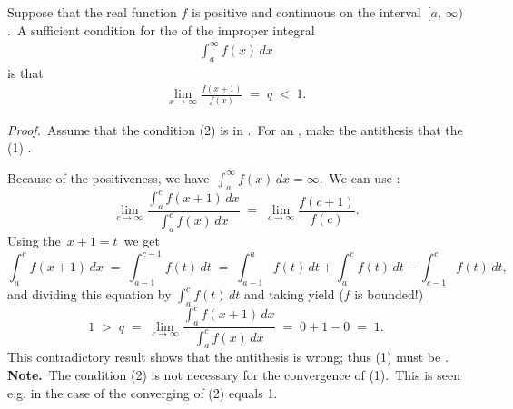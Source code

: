 \documentclass[12pt]{article}
\theoremstyle{definition}
\begin{document}
Suppose that the real function $f$ is positive and continuous on the interval \,$[a,\,\infty)$.\, A sufficient condition for the  of the improper integral
\begin{align}
\int_a^\infty\!f(x)\,dx
\end{align}
is that
\begin{align}
\lim_{x\to\infty}\frac{f(x\!+\!1)}{f(x)} \;=\; q \;<\; 1.
\end{align}

\emph{Proof.}\, Assume that the condition (2) is in .\, For an , make the antithesis that the  (1) .

Because of the positiveness, we have\, $\int_a^\infty\!f(x)\,dx = \infty$.\, We can use :
$$\lim_{c\to\infty}\frac{\int_a^c\!f(x\!+\!1)\,dx}{\int_a^c\!f(x)\,dx} \;=\; \lim_{c\to\infty}\frac{f(c\!+\!1)}{f(c)}.$$
Using the  \,$x\!+\!1 = t$\, we get
$$\int_a^c\!f(x\!+\!1)\,dx \;=\; \int_{a-1}^{c-1}f(t)\,dt 
\;=\; \int_{a-1}^a\!f(t)\,dt+\int_a^c\!f(t)\,dt-\int_{c-1}^c\!f(t)\,dt,$$
and dividing this equation by $\int_a^cf(t)\,dt$ and taking  yield ($f$ is bounded!)
$$1 \;>\; q \;=\; \lim_{c\to\infty}\frac{\int_a^c\!f(x\!+\!1)\,dx}{\int_a^c\!f(x)\,dx} \;=\; 0+1-0 \;=\; 1.$$
This contradictory result shows that the antithesis is wrong; thus (1) must be .\\

\textbf{Note.}\, The condition (2) is not necessary for the convergence of (1).\, This is seen e.g. in the case of the converging  of (2) equals 1.
\end{document}
